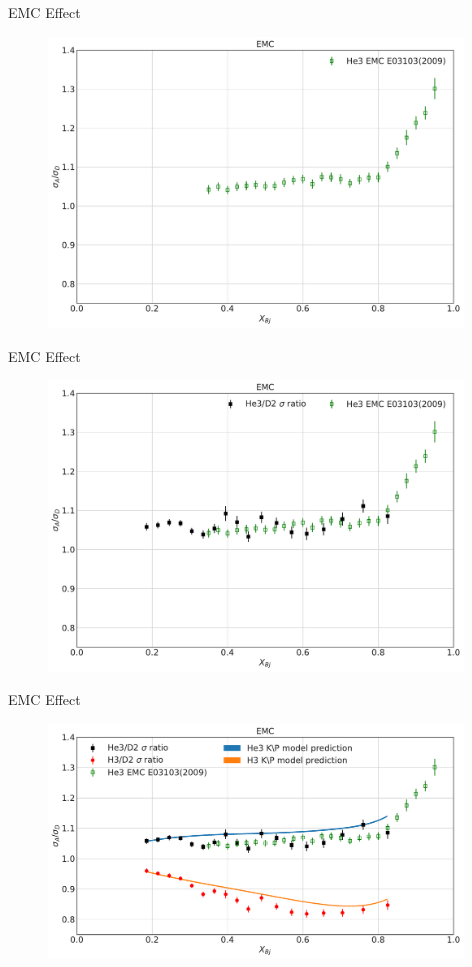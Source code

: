 \documentclass[12pt]{beamer}
\begin{document}
\begin{frame}{EMC Effect}
\vspace{-20pt}
	\begin{figure}
		\includegraphics[width=11cm]{../images/EMC1.pdf}
	\end{figure}
\end{frame}
\begin{frame}{EMC Effect}
\vspace{-20pt}
\begin{figure}
	\includegraphics[width=11cm]{../images/EMC2.pdf}
\end{figure}
\end{frame}

\begin{frame}{EMC Effect}
\vspace{-20pt}
\begin{figure}
	\includegraphics[width=11cm]{../images/EMC.pdf}
\end{figure}
\end{frame}
\end{document}
